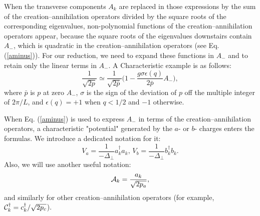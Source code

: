 \documentclass[a4paper,12pt]{article}
\begin{document}
When the transverse components $A_k$ are replaced in those expressions 
by the sum of the creation--annihilation operators divided by 
the square roots of the corresponding eigenvalues, 
non-polynomial functions of the creation--annihilation 
operators appear, because the square roots of the eigenvalues 
downstairs contain $A_-$, which is quadratic in 
the creation--annihilation operators (see Eq. 
(\ref{aminus})). For our reduction, we need to expand these 
functions in $A_-$ and to retain only the linear terms in $A_-$. 
A Characteristic example is as follows:
\begin{equation}
\label{example}
\frac{1}{\sqrt{2p}} \simeq \frac{1}{\sqrt{2\bar{p}}}
\bigg( 1 -
\frac{g\sigma\epsilon(q)}{2\bar{p}}A_- \bigg),
\end{equation}
where $\bar{p}$ is $p$ at zero $A_-$, $\sigma$ is the sign 
of the deviation of $p$ off the multiple integer of $2\pi/L$, 
and $\epsilon(q) = +1$ when $q<1/2$ and $-1$ otherwise. 

When Eq. (\ref{aminus}) is used to express $A_-$ in terms of the 
creation--annihilation operators, a characteristic 
"potential" generated by the $a$- or $b$-
charges enters the formulas. We introduce a dedicated notation for it:
\begin{equation}
\label{potential}
V_{a}=\frac{1}{-\Delta_\perp}a^\dagger_ka_k,\, 
V_{b}=\frac{1}{-\Delta_\perp}b^\dagger_kb_k.
\end{equation}
Also, we will use another useful notation:
\begin{equation}
\label{cal}
{\cal A}_k = \frac{a_k}{\sqrt{2p_a}},
\end{equation}
and similarly for other creation--annihilation operators (for example, 
${\cal C}^\dagger_k = c^\dagger_k/\sqrt{2p_c}$). 
\end{document}
